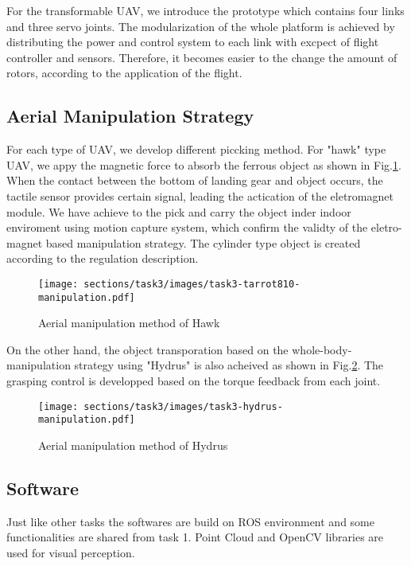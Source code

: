 \documentclass{standalone}
\begin{document}
For the transformable UAV, we introduce the prototype which contains four links and three servo joints. The modularization of the whole platform is achieved by distributing the power and control system to each link with excpect of flight controller and sensors. Therefore, it becomes easier to the change the amount of rotors, according to the application of the flight.

\subsection{Aerial Manipulation Strategy}
For each type of UAV, we develop different piccking method. For "hawk" type UAV, we appy the magnetic force to absorb the ferrous object as shown in Fig.\ref{fig:task3-hawk-manipulation}. When the contact between the bottom of landing gear and object occurs, the tactile sensor provides certain signal, leading the actication of the eletromagnet module. We have achieve to the pick and carry the object inder indoor enviroment using motion capture system, which confirm the validty of the eletro-magnet based manipulation strategy. The cylinder type object is created according to the regulation description.

\begin{figure}[h]
  \begin{center}
    \texttt{[image: sections/task3/images/task3-tarrot810-manipulation.pdf]}
    \caption{Aerial manipulation method of Hawk}
    \label{fig:task3-hawk-manipulation}
  \end{center}
\end{figure} 

On the other hand, the object transporation based on the whole-body-manipulation strategy using "Hydrus" is also acheived as shown in Fig.\ref{fig:task3-hydrus-manipulation}. The grasping control is developped  based on the torque feedback from each joint. 

\begin{figure}[h]
  \begin{center}
    \texttt{[image: sections/task3/images/task3-hydrus-manipulation.pdf]}
    \caption{Aerial manipulation method of Hydrus}
    \label{fig:task3-hydrus-manipulation}
  \end{center}
\end{figure} 

\subsection{Software}
Just like other tasks the softwares are build on ROS environment and some functionalities are shared from task 1. Point Cloud and OpenCV libraries are used for visual perception. %
\end{document}
